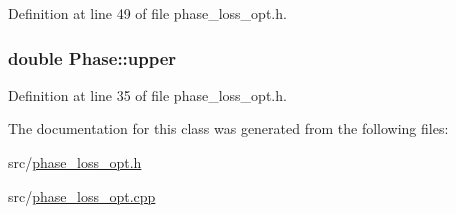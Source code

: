Definition at line 49 of file phase\+\_\+loss\+\_\+opt.\+h.

\hypertarget{class_phase_abe5215ac7a99447da0f2075e87b6e1d1}{}
\subsubsection[{upper}]{\setlength{\rightskip}{0pt plus 5cm}double Phase\+::upper}\label{class_phase_abe5215ac7a99447da0f2075e87b6e1d1}


Definition at line 35 of file phase\+\_\+loss\+\_\+opt.\+h.



The documentation for this class was generated from the following files\+:\begin{DoxyCompactItemize}
\item 
src/\hyperlink{phase__loss__opt_8h}{phase\+\_\+loss\+\_\+opt.\+h}\item 
src/\hyperlink{phase__loss__opt_8cpp}{phase\+\_\+loss\+\_\+opt.\+cpp}\end{DoxyCompactItemize}
